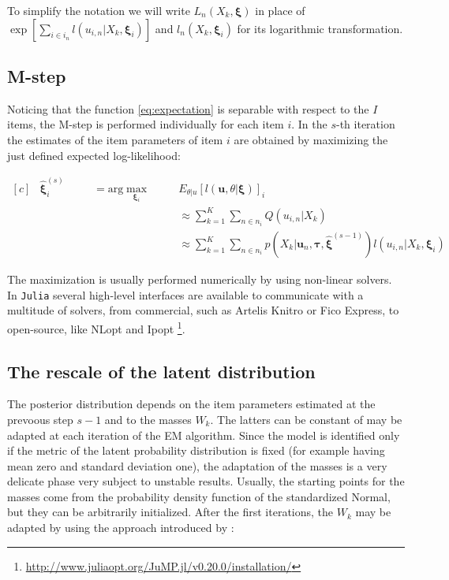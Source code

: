 To simplify the notation we will write $\mathit{L}_n(X_k,\boldsymbol{\xi})$ in place of $ \exp\left[ \sum_{i \in i_n}{\mathit{l}(u_{i,n}|X_k,\boldsymbol{\xi}_i)}\right]$ and $\mathit{l}_n(X_k,\boldsymbol{\xi}_i)$ for its logarithmic transformation.



\subsection{M-step}
Noticing that the function \eqref{eq:expectation} is separable with respect to the $I$ items, the M-step is performed individually for each item $i$. In the $s$-th iteration the estimates of the item parameters of item $i$ are obtained by maximizing the just defined expected log-likelihood:

\begin{equation}\label{eq:M-step}
\begin{aligned}[c]
& \hat{\boldsymbol{\xi}}_i^{(s)} && \quad = \text{arg}\max_{\boldsymbol{\xi}_i} \quad &&  E_{\theta|u}\left[\mathit{l}(\boldsymbol{u},\theta|\boldsymbol{\xi})\right]_i \\
& && && \approx \sum_{k=1}^K{\sum_{n \in n_i}{Q(u_{i,n}|X_k)}} \\ 
& && && \approx \sum_{k=1}^K\sum_{n \in n_i}{p(X_k|\boldsymbol{u}_n,\boldsymbol{\tau},\hat{\boldsymbol{\xi}}^{(s-1)})\mathit{l}(u_{i,n}|X_k,\boldsymbol{\xi}_i)} 
\end{aligned}
\end{equation}

The maximization is usually performed numerically by using non-linear solvers. In \texttt{Julia} several high-level interfaces are available to communicate with a multitude of solvers, from commercial, such as Artelis Knitro or Fico Express, to open-source, like NLopt and Ipopt \footnote{\url{http://www.juliaopt.org/JuMP.jl/v0.20.0/installation/}}.

\subsection{The rescale of the latent distribution}

The posterior distribution depends on the item parameters estimated at the prevoous step $s-1$ and to the masses $W_k$. The latters can be constant of may be adapted at each iteration of the EM algorithm. Since the model is identified only if the metric of the latent probability distribution is fixed (for example having mean zero and standard deviation one), the adaptation of the masses is a very delicate phase very subject to unstable results. Usually, the starting points for the masses come from the probability density function of the standardized Normal, but they can be arbitrarily initialized. After the first iterations, the $W_k$ may be adapted by using the approach introduced by \textcite{mislevy1984estimating}:

